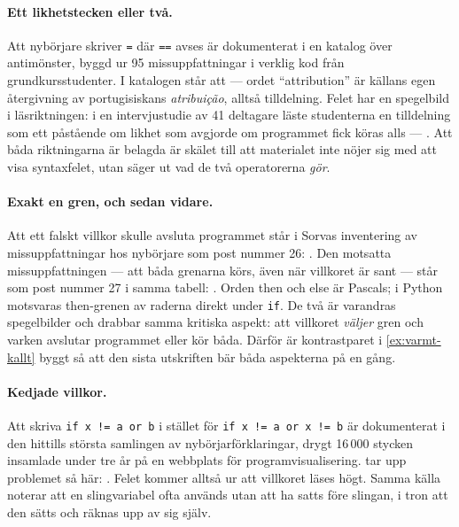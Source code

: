 \paragraph{Ett likhetstecken eller två.}  Att nybörjare skriver
\texttt{=} där \texttt{==} avses är dokumenterat
i en katalog över antimönster, byggd ur 95 missuppfattningar i verklig
kod från grundkursstudenter.  I katalogen står att
 --- ordet
\enquote{\foreignlanguage{english}{attribution}} är källans egen
återgivning av portugisiskans \emph{atribuição}, alltså tilldelning.
Felet har en spegelbild i läsriktningen: i en intervjustudie av 41
deltagare läste studenterna en tilldelning som ett påstående om likhet
som avgjorde om programmet fick köras alls ---
.  Att båda riktningarna är belagda är skälet till att
materialet inte nöjer sig med att visa syntaxfelet, utan säger ut vad de
två operatorerna \emph{gör}.

\paragraph{Exakt en gren, och sedan vidare.}  Att ett falskt villkor
skulle avsluta programmet står i Sorvas inventering av
missuppfattningar hos nybörjare som post nummer 26:
.  Den motsatta missuppfattningen --- att
båda grenarna körs, även när villkoret är sant --- står som post nummer
27 i samma tabell:
.  Orden \foreignlanguage{english}{then} och
\foreignlanguage{english}{else} är Pascals; i Python motsvaras
\foreignlanguage{english}{then}-grenen av raderna direkt under
\texttt{if}.  De två är varandras
spegelbilder och drabbar samma kritiska aspekt: att villkoret
\emph{väljer} gren och varken avslutar programmet eller kör båda.  Därför
är kontrastparet i \cref{ex:varmt-kallt} byggt så att den sista
utskriften bär båda aspekterna på en gång.

\paragraph{Kedjade villkor.}  Att skriva
\texttt{if x != a or b} i stället för
\texttt{if x != a or x != b} är dokumenterat i den hittills
största samlingen av nybörjarförklaringar, drygt 16\,000 stycken
insamlade under tre år på en webbplats för programvisualisering.
\Textcite{GuoMarkelZhang2020} tar upp problemet så här:
.  Felet kommer alltså ur att villkoret läses
högt.  Samma källa noterar att en slingvariabel ofta
används utan att ha satts före slingan, i tron att den sätts och räknas
upp av sig själv.

